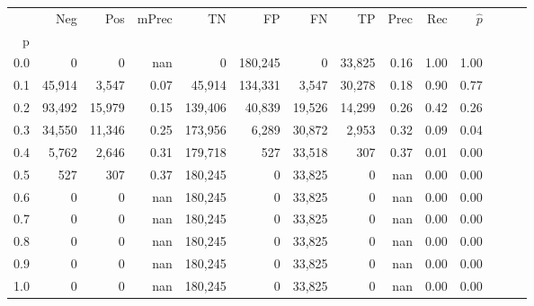 \begin{tabular}{rrrrrrrrrrrrrr}
\toprule
{} &     Neg &     Pos & mPrec &       TN &       FP &      FN &      TP &  Prec &   Rec & $\hat{p}$ \\
p   &         &         &       &          &          &         &         &       &       &           \\
\midrule
0.0 &       0 &       0 &   nan &        0 &  180,245 &       0 &  33,825 &  0.16 &  1.00 &      1.00 \\
0.1 &  45,914 &   3,547 &  0.07 &   45,914 &  134,331 &   3,547 &  30,278 &  0.18 &  0.90 &      0.77 \\
0.2 &  93,492 &  15,979 &  0.15 &  139,406 &   40,839 &  19,526 &  14,299 &  0.26 &  0.42 &      0.26 \\
0.3 &  34,550 &  11,346 &  0.25 &  173,956 &    6,289 &  30,872 &   2,953 &  0.32 &  0.09 &      0.04 \\
0.4 &   5,762 &   2,646 &  0.31 &  179,718 &      527 &  33,518 &     307 &  0.37 &  0.01 &      0.00 \\
0.5 &     527 &     307 &  0.37 &  180,245 &        0 &  33,825 &       0 &   nan &  0.00 &      0.00 \\
0.6 &       0 &       0 &   nan &  180,245 &        0 &  33,825 &       0 &   nan &  0.00 &      0.00 \\
0.7 &       0 &       0 &   nan &  180,245 &        0 &  33,825 &       0 &   nan &  0.00 &      0.00 \\
0.8 &       0 &       0 &   nan &  180,245 &        0 &  33,825 &       0 &   nan &  0.00 &      0.00 \\
0.9 &       0 &       0 &   nan &  180,245 &        0 &  33,825 &       0 &   nan &  0.00 &      0.00 \\
1.0 &       0 &       0 &   nan &  180,245 &        0 &  33,825 &       0 &   nan &  0.00 &      0.00 \\
\bottomrule
\end{tabular}

